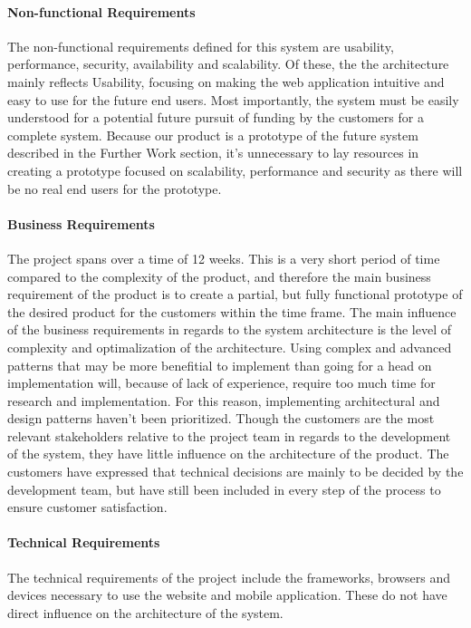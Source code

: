 \documentclass[11pt]{report}
\begin{document}
\paragraph{Non-functional Requirements}
The non-functional requirements defined for this system are usability, performance, security, availability and scalability. Of these, the the architecture mainly reflects Usability, focusing on making the web application intuitive and easy to use for the future end users. Most importantly, the system must be easily understood for a potential future pursuit of funding by the customers for a complete system. Because our product is a prototype of the future system described in the Further Work section, it's unnecessary to lay resources in creating a prototype focused on scalability, performance and security as there will be no real end users for the prototype. 

\paragraph{Business Requirements}
The project spans over a time of 12 weeks. This is a very short period of time compared to the complexity of the product, and therefore the main business requirement of the product is to create a partial, but fully functional prototype of the desired product for the customers within the time frame. The main influence of the business requirements in regards to the system architecture is the level of complexity and optimalization of the architecture. Using complex and advanced patterns that may be more benefitial to implement than going for a head on implementation will, because of lack of experience, require too much time for research and implementation. For this reason, implementing architectural and design patterns haven't been prioritized. Though the customers are the most relevant stakeholders relative to the project team in regards to the development of the system, they have little influence on the architecture of the product. The customers have expressed that technical decisions are mainly to be decided by the development team, but have still been included in every step of the process to ensure customer satisfaction. 

\paragraph{Technical Requirements}
The technical requirements of the project include the frameworks, browsers and devices necessary to use the website and mobile application. These do not have direct influence on the architecture of the system. 
\end{document}
